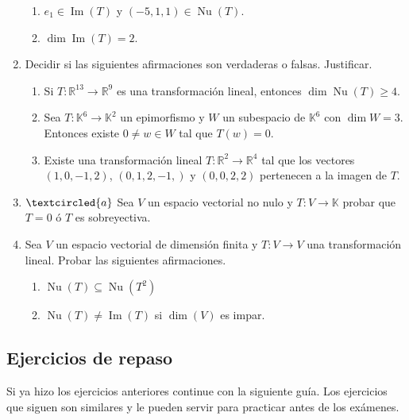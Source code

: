 \documentclass[a4paper,12pt,twoside,spanish,reqno]{amsbook}
\numberwithin{equation}{section}
\begin{document}
\begin{enumerate}[topsep=6pt, itemsep=.4cm]
\begin{enumerate}[ topsep=5pt,itemsep=5pt]
        \item $e_1\in\operatorname{Im}(T)$ y $(-5,1,1)\in\operatorname{Nu}(T)$.
        
        \item $\operatorname{dim} \operatorname{Im}(T)=2$.
    \end{enumerate}
    

\item Decidir si las siguientes afirmaciones son verdaderas o falsas. Justificar.
\begin{enumerate}
\item  Si $T : \mathbb R^{13} \to \mathbb R^9$ es una transformación lineal, entonces $\dim \operatorname{Nu}(T) \geq  4$.
\item Sea $T:\mathbb{K}^{6}\longrightarrow\mathbb{K}^2$ un epimorfismo y $W$ un subespacio de $\mathbb{K}^{6}$ con $\dim W=3$. Entonces existe $0\neq w\in W$ tal que $T(w)=0$.
\item Existe una transformación lineal $T : \mathbb R^2 \to \mathbb R^4$ tal que los vectores $(1, 0, -1, 2)$, $(0, 1, 2,-1,)$ y $(0, 0, 2, 2)$ pertenecen a la imagen de $T$.

\end{enumerate}

\item \label{funcionales} $\textcircled{a}$ Sea $V$ un espacio vectorial no nulo y $T:V\longrightarrow\mathbb{K}$ probar que $T=0$ ó $T$ es sobreyectiva.

\item Sea $V$ un espacio vectorial de dimensión finita y $T:V\longrightarrow V$ una transformación lineal. Probar las siguientes afirmaciones.
    \begin{multicols}{2}
     \begin{enumerate}
    \item $\operatorname{Nu}(T)\subseteq\operatorname{Nu}(T^2)$
    \item\label{dimV impar} $\operatorname{Nu}(T)\neq\operatorname{Im}(T)$ si $\dim(V)$ es impar.
    \end{enumerate}
    \end{multicols}
      
\end{enumerate}


\subsection*{Ejercicios de repaso}
Si ya hizo los ejercicios anteriores continue con la siguiente guía. Los ejercicios que siguen son similares y le pueden servir para practicar antes de los exámenes.
\end{document}
